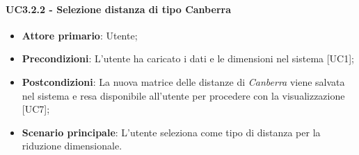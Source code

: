 \paragraph{UC3.2.2 - Selezione distanza di tipo Canberra}
\begin{itemize}
	\item \textbf{Attore primario}: Utente;
	\item \textbf{Precondizioni}: L'utente ha caricato i dati e le dimensioni nel sistema [UC1];
	\item \textbf{Postcondizioni}: La nuova matrice delle distanze di \textit{Canberra} viene salvata nel sistema e resa disponibile all'utente per procedere con la visualizzazione [UC7];
	\item \textbf{Scenario principale}: L'utente seleziona  come tipo di distanza per la riduzione dimensionale.

\end{itemize}
